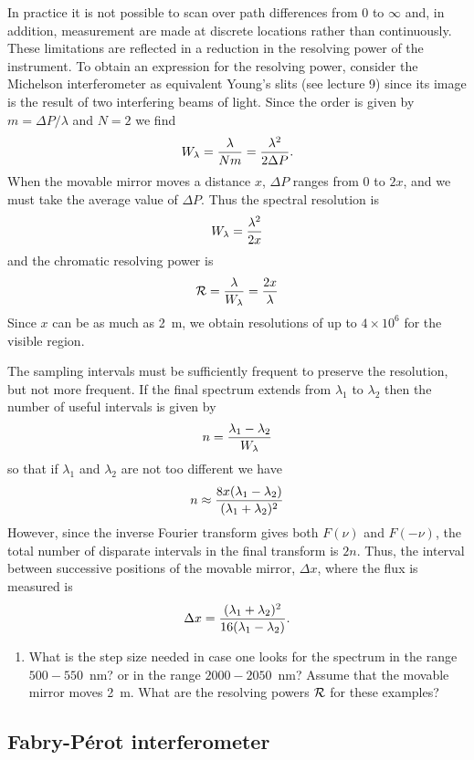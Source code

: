 In practice it is not possible to scan over path differences from 0 to $\infty$ and, in 
addition, measurement are made at discrete locations rather than continuously. These
limitations are reflected in a reduction in the resolving power of the instrument. To obtain an expression for the resolving power, consider the Michelson interferometer as equivalent Young's slits (see lecture 9) since its image is the result of two interfering
beams of light. Since the order is given by $m=\Delta P/\lambda$ and $N=2$ we find
\[
W_\lambda={\lambda\over Nm}={\lambda^2\over 2\Delta P}.
\]
When the movable mirror moves a distance $x$, $\Delta P$ ranges from $0$ to $2x$, and we must take the average value of $\Delta P$. Thus the spectral resolution is
\[
W_\lambda={\lambda^2\over 2x}
\]
and the chromatic resolving power is 
\[
{\cal R}={\lambda\over W_\lambda}={2x\over\lambda}
\]
Since $x$ can be as much as 2~m, we obtain resolutions of up to $4\times 10^6$ for the
visible region. 

The sampling intervals must be sufficiently frequent to preserve the resolution, but not more frequent. If the final spectrum extends from $\lambda_1$ to $\lambda_2$ then the
number of useful intervals is given by 
\[
n={\lambda_1-\lambda_2\over W_\lambda}
\]
so that if $\lambda_1$ and $\lambda_2$ are not too different we have
\[
n\approx{8x(\lambda_1-\lambda_2)\over(\lambda_1+\lambda_2)^2}
\]
However, since the inverse Fourier transform gives both $F(\nu)$ and $F(-\nu)$, the total
number of disparate intervals in the final transform is $2n$. Thus, the interval between successive positions of the movable mirror, $\Delta x$, where the flux is measured is
\[
\Delta x={(\lambda_1+\lambda_2)^2\over 16(\lambda_1-\lambda_2)}.
\]


\begin{enumerate}
\setcounter{enumi}{\value{count}}
\item What is the step size needed in case one looks for the spectrum
  in the range $500-550$~nm? or in the range $2000-2050$~nm? Assume
  that the movable mirror moves 2~m. What are the resolving powers
  ${\cal R}$ for these examples?
\setcounter{count}{\value{enumi}}
\end{enumerate}


\subsection{Fabry-P\'erot interferometer}

